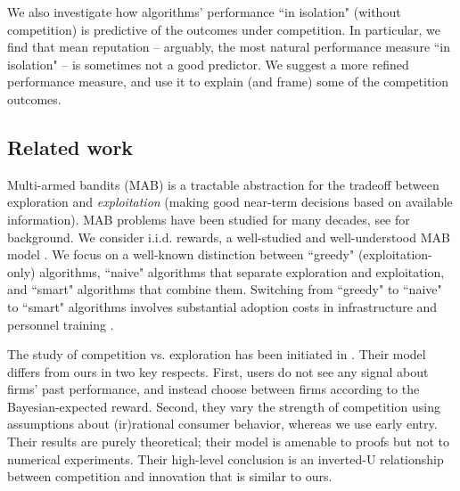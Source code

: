 \documentclass[../competing_bandits_with_appendix.tex]{subfiles}
\begin{document}

We also investigate how algorithms' performance ``in isolation" (without competition) is predictive of the outcomes under competition. In particular, we find that mean reputation -- arguably, the most natural performance measure ``in isolation" -- is sometimes not a good predictor. We suggest a more refined performance measure, and use it to explain (and frame) some of the competition outcomes.


\subsection{Related work}

 Multi-armed bandits (MAB) is a tractable abstraction for the tradeoff between exploration and \emph{exploitation} (making good near-term decisions based on available information). MAB problems have been studied for many decades, see \cite{Bubeck-survey12} for background. We consider i.i.d. rewards, a well-studied and well-understood MAB model \cite{bandits-ucb1}. We focus on a well-known distinction between ``greedy" (exploitation-only) algorithms, ``naive" algorithms that separate exploration and exploitation, and ``smart" algorithms that combine them. Switching from ``greedy" to ``naive" to ``smart" algorithms involves substantial adoption costs in infrastructure and personnel training \cite{MWT-WhitePaper-2016,DS-arxiv}.

The study of competition vs. exploration has been initiated in \cite{CompetingBandits-itcs16}. Their model differs from ours in two key respects. First, users do not see any signal about firms' past performance, and instead choose between firms according to the Bayesian-expected reward. Second, they vary the strength of competition using assumptions about (ir)rational consumer behavior, whereas we use early entry. Their results are purely theoretical; their model is amenable to proofs but not to numerical experiments. Their high-level conclusion is an inverted-U relationship between competition and innovation that is similar to ours.
\end{document}
